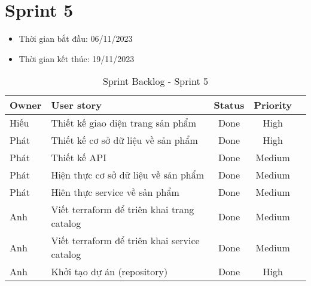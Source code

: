 \section{Sprint 5}
\begin{itemize}
    \item Thời gian bắt đầu: 06/11/2023
    \item Thời gian kết thúc: 19/11/2023
\end{itemize}
\begin{table}[H]
    \begin{tabular}{|m{2.5cm}|m{9cm}|c|c|c|}
    \hline
    \textbf{Owner}  & \textbf{User story}                                & \textbf{Status}  & \textbf{Priority} \\ \hline
    Hiếu               & Thiết kế giao diện trang sản phẩm                     & Done                              & High           \\ \hline
    Phát                & Thiết kế cơ sở dữ liệu về sản phẩm                     & Done                              & High           \\ \hline
    Phát                & Thiết kế API                      & Done                              & Medium          \\ \hline
    Phát               & Hiện thực cơ sở dữ liệu về sản phẩm                     & Done                              & Medium          \\ \hline
    Phát                & Hiên thực service về sản phẩm                     & Done                              & Medium          \\ \hline
    Anh               & Viết terraform để triên khai trang catalog                     & Done                              & Medium          \\ \hline
    Anh                & Viết terraform để triên khai service catalog                     & Done                              & Medium          \\ \hline
    Anh                & Khởi tạo dự án (repository)                    & Done                              & High           \\ \hline
    \end{tabular}
    \caption{Sprint Backlog - Sprint 5}
    \label{tab:sprint-5}
\end{table}
